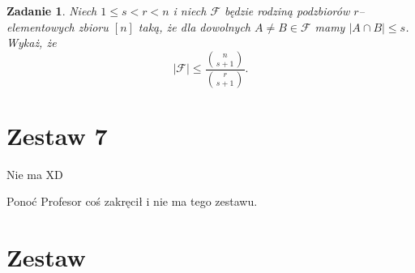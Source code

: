 \documentclass{mwart}
\newtheorem{zad}{Zadanie}[section]
\begin{document}
\begin{zad}
    Niech $1 \leq s < r < n$ i niech $\mathcal{F }$ będzie rodziną podzbiorów $r$--elementowych
    zbioru $[n]$ taką, że dla dowolnych $A \neq B \in \mathcal{F }$ mamy $ |A \cap B| \leq s$.
    Wykaż, że \[|\mathcal{F }| \leq \frac{\binom{n}{s+1}}{\binom{r}{s+1}}.\]
\end{zad}
\begin{mdframed}

\end{mdframed}
\begin{mdframed}

\end{mdframed}













\newpage
\section{Zestaw 7}          %
Nie ma XD

Ponoć Profesor coś zakręcił i nie ma tego zestawu.































\newpage
\section{Zestaw}          %
\end{document}
